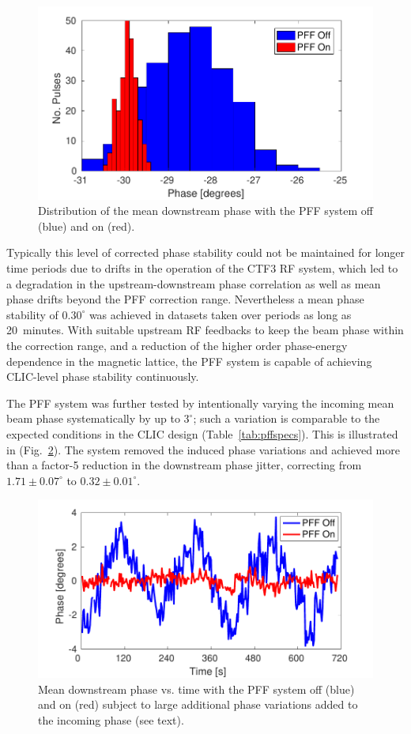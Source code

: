 \documentclass[%
 reprint,
 superscriptaddress,
 amsmath,
 amssymb,
 prl,
]{revtex4-1}
\begin{document}
\begin{figure}
	\includegraphics[width=\columnwidth]{figs/meanJit}
	\caption{\label{fig:meanJit}Distribution of the mean downstream phase with 
		the 
		PFF system off (blue) and on (red).}
\end{figure}

Typically this level of corrected phase stability could not be maintained for 
longer time periods due to drifts in the operation of the CTF3 RF system, which 
led to  a degradation in the upstream-downstream phase correlation as well as 
mean phase drifts beyond the PFF correction range. Nevertheless a mean phase 
stability of \(0.30^\circ\) was achieved in datasets taken over periods as long 
as 20~minutes. With suitable upstream RF feedbacks to keep the beam phase 
within the correction range, and a reduction of the higher order phase-energy 
dependence in the magnetic lattice, the PFF system is capable of achieving 
CLIC-level phase stability continuously.

The PFF system was further tested by intentionally varying the incoming mean 
beam phase systematically by up to \(3^\circ\); such a variation is comparable 
to the expected conditions in the CLIC design (Table~\ref{tab:pffspecs}). 
This is illustrated in (Fig.~\ref{fig:wiggle}). The system removed the induced 
phase variations and achieved more than a factor-5 reduction in the downstream 
phase jitter, correcting from \(1.71\pm0.07^\circ\) to \(0.32\pm0.01^\circ\). 

\begin{figure}
	\includegraphics[width=\columnwidth]{figs/wiggle}
	\caption{\label{fig:wiggle}Mean downstream phase vs. time with the PFF 
	system off (blue) and on (red) subject to large additional phase variations 
	added to the incoming phase (see text).}
\end{figure}
\end{document}
